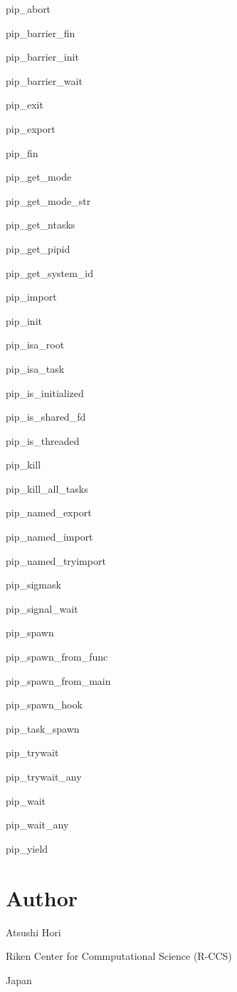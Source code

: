 \begin{DoxyItemize}
\item pip\-\_\-abort
\item pip\-\_\-barrier\-\_\-fin
\item pip\-\_\-barrier\-\_\-init
\item pip\-\_\-barrier\-\_\-wait
\item pip\-\_\-exit
\item pip\-\_\-export
\item pip\-\_\-fin
\item pip\-\_\-get\-\_\-mode
\item pip\-\_\-get\-\_\-mode\-\_\-str
\item pip\-\_\-get\-\_\-ntasks
\item pip\-\_\-get\-\_\-pipid
\item pip\-\_\-get\-\_\-system\-\_\-id
\item pip\-\_\-import
\item pip\-\_\-init
\item pip\-\_\-isa\-\_\-root
\item pip\-\_\-isa\-\_\-task
\item pip\-\_\-is\-\_\-initialized
\item pip\-\_\-is\-\_\-shared\-\_\-fd
\item pip\-\_\-is\-\_\-threaded
\item pip\-\_\-kill
\item pip\-\_\-kill\-\_\-all\-\_\-tasks
\item pip\-\_\-named\-\_\-export
\item pip\-\_\-named\-\_\-import
\item pip\-\_\-named\-\_\-tryimport
\item pip\-\_\-sigmask
\item pip\-\_\-signal\-\_\-wait
\item pip\-\_\-spawn
\item pip\-\_\-spawn\-\_\-from\-\_\-func
\item pip\-\_\-spawn\-\_\-from\-\_\-main
\item pip\-\_\-spawn\-\_\-hook
\item pip\-\_\-task\-\_\-spawn
\item pip\-\_\-trywait
\item pip\-\_\-trywait\-\_\-any
\item pip\-\_\-wait
\item pip\-\_\-wait\-\_\-any
\item pip\-\_\-yield
\end{DoxyItemize}

\section*{Author}

Atsushi Hori\par
Riken Center for Commputational Science (R-\/\-C\-C\-S)\par
Japan\par
